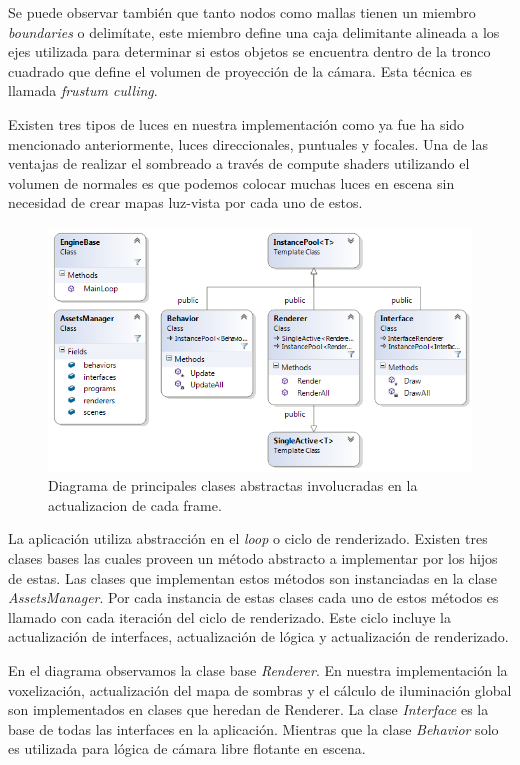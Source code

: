 Se puede observar también que tanto nodos como mallas tienen un miembro \emph{boundaries} o delimítate, este miembro define una caja delimitante alineada a los ejes utilizada para determinar si estos objetos se encuentra dentro de la tronco cuadrado que define el volumen de proyección de la cámara. Esta técnica es llamada \emph{frustum culling}. 

Existen tres tipos de luces en nuestra implementación como ya fue ha sido mencionado anteriormente, luces direccionales, puntuales y focales. Una de las ventajas de realizar el sombreado a través de compute shaders utilizando el volumen de normales es que podemos colocar muchas luces en escena sin necesidad de crear mapas luz-vista por cada uno de estos.

\begin{figure}[H]
	\centering
	\captionsetup{justification=centering}
	\includegraphics[width=\linewidth]{media/ClassDiagram.png}
	\caption{Diagrama de principales clases abstractas involucradas en la actualizacion de cada frame.}
\end{figure}

La aplicación utiliza abstracción en el \emph{loop} o ciclo de renderizado. Existen tres clases bases las cuales proveen un método abstracto a implementar por los hijos de estas. Las clases que implementan estos métodos son instanciadas en la clase \emph{AssetsManager}. Por cada instancia de estas clases cada uno de estos métodos es llamado con cada iteración del ciclo de renderizado. Este ciclo incluye la actualización de interfaces, actualización de lógica y actualización de renderizado.

En el diagrama observamos la clase base \emph{Renderer}. En nuestra implementación la voxelización, actualización del mapa de sombras y el cálculo de iluminación global son implementados en clases que heredan de Renderer. La clase \emph{Interface} es la base de todas las interfaces en la aplicación. Mientras que la clase \emph{Behavior} solo es utilizada para lógica de cámara libre flotante en escena.

